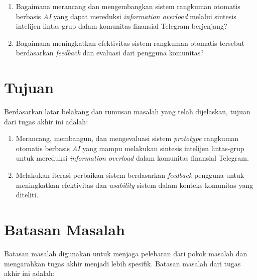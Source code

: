 \begin{enumerate}
\item Bagaimana merancang dan mengembangkan sistem rangkuman otomatis berbasis \textit{AI} yang dapat mereduksi \textit{information overload} melalui sintesis intelijen lintas-grup dalam komunitas finansial Telegram berjenjang?
\item Bagaimana meningkatkan efektivitas sistem rangkuman otomatis tersebut berdasarkan \textit{feedback} dan evaluasi dari pengguna komunitas?
\end{enumerate}

\section{Tujuan}
Berdasarkan latar belakang dan rumusan masalah yang telah dijelaskan, tujuan dari tugas akhir ini adalah:

\begin{enumerate}
\item Merancang, membangun, dan mengevaluasi sistem \textit{prototype} rangkuman otomatis berbasis \textit{AI} yang mampu melakukan sintesis intelijen lintas-grup untuk mereduksi \textit{information overload} dalam komunitas finansial Telegram.
\item Melakukan iterasi perbaikan sistem berdasarkan \textit{feedback} pengguna untuk meningkatkan efektivitas dan \textit{usability} sistem dalam konteks komunitas yang diteliti.
\end{enumerate}

\section{Batasan Masalah}
Batasan masalah digunakan untuk menjaga pelebaran dari pokok masalah dan mengarahkan tugas akhir menjadi lebih spesifik. Batasan masalah dari tugas akhir ini adalah:

